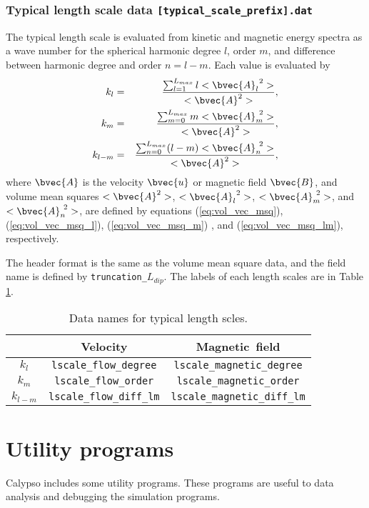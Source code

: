\subsubsection{Typical length scale data {\tt [typical\_scale\_prefix].dat}}
The typical length scale is evaluated from kinetic and magnetic energy spectra as a wave number for the spherical harmonic degree $l$, order $m$, and difference between harmonic degree and order $n = l-m$. Each value is evaluated by
%
\begin{eqnarray}
k_{l} & = & \frac{\sum_{l=1}^{L_{max}} l <\bvec{A}_{l}^{\ 2} >}{<\bvec{A}^{2} >},
\\
k_{m} & = & \frac{\sum_{m=0}^{L_{max}} m <\bvec{A}_{m}^{\ 2} >}{<\bvec{A}^{2} >}, 
\\
k_{l-m} & = & \frac{\sum_{n=0}^{L_{max}} (l-m) <\bvec{A}_{n}^{\ 2} >}{<\bvec{A}^{2} >},
\end{eqnarray}
%
where $\bvec{A}$ is the velocity $\bvec{u}$ or magnetic field $\bvec{B}$, and volume mean squares $<\bvec{A}^{2}>$, $<\bvec{A}_{l}^{\ 2}>$, $<\bvec{A}_{m}^{\ 2}>$, and $<\bvec{A}_{n}^{\ 2}>$, are defined by equations (\ref{eq:vol_vec_msq}), (\ref{eq:vol_vec_msq_l}), (\ref{eq:vol_vec_msq_m}) , and (\ref{eq:vol_vec_msq_lm}), respectively.

The header format is the same as the volume mean square data, and the field name is defined by {\tt truncation\_}$L_{dip}$. The labels of each length scales are in Table \ref{table:scale_name}.
%
\begin{table}[htp]
\caption{Data names for typical length scles.}
\begin{center}
\begin{tabular}{|c|c|c|}
\hline
 & \mbox{Velocity} & \mbox{Magnetic field} \\ \hline
$k_{l}$ & {\tt lscale\_flow\_degree} & {\tt lscale\_magnetic\_degree} \\
$k_{m}$ & {\tt lscale\_flow\_order} & {\tt lscale\_magnetic\_order} \\
$k_{l-m}$ & {\tt lscale\_flow\_diff\_lm} & {\tt lscale\_magnetic\_diff\_lm} 
\\ \hline 
\end{tabular}
\end{center}
\label{table:scale_name}
\end{table}%
%

\newpage

\section{Utility programs}
Calypso includes some utility programs. These programs are useful to data analysis and debugging the simulation programs.


